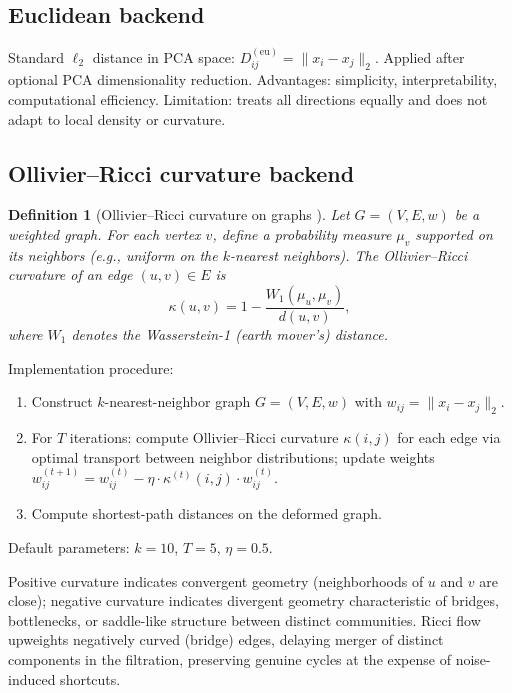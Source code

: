 \documentclass[11pt]{article}
\newtheorem{definition}[theorem]{Definition}
\begin{document}
\subsection{Euclidean backend}

Standard $\ell_2$ distance in PCA space: $D^{(\text{eu})}_{ij} = \|x_i - x_j\|_2$.
Applied after optional PCA dimensionality reduction.
Advantages: simplicity, interpretability, computational efficiency.
Limitation: treats all directions equally and does not adapt to local density or curvature.

\subsection{Ollivier--Ricci curvature backend}

\begin{definition}[Ollivier--Ricci curvature on graphs \cite{ollivier2007,ollivier2009}]\label{def:supp_ricci}
Let $G = (V, E, w)$ be a weighted graph.
For each vertex $v$, define a probability measure $\mu_v$ supported on its neighbors (e.g., uniform on the $k$-nearest neighbors).
The \emph{Ollivier--Ricci curvature} of an edge $(u,v) \in E$ is
\[
\kappa(u,v) = 1 - \frac{W_1(\mu_u, \mu_v)}{d(u,v)},
\]
where $W_1$ denotes the Wasserstein-1 (earth mover's) distance.
\end{definition}

Implementation procedure:
\begin{enumerate}[leftmargin=1.5em]
\item Construct $k$-nearest-neighbor graph $G = (V, E, w)$ with $w_{ij} = \|x_i - x_j\|_2$.
\item For $T$ iterations: compute Ollivier--Ricci curvature $\kappa(i,j)$ for each edge via optimal transport between neighbor distributions; update weights $w_{ij}^{(t+1)} = w_{ij}^{(t)} - \eta \cdot \kappa^{(t)}(i,j) \cdot w_{ij}^{(t)}$.
\item Compute shortest-path distances on the deformed graph.
\end{enumerate}
Default parameters: $k=10$, $T=5$, $\eta=0.5$.

Positive curvature indicates convergent geometry (neighborhoods of $u$ and $v$ are close); negative curvature indicates divergent geometry characteristic of bridges, bottlenecks, or saddle-like structure between distinct communities.
Ricci flow upweights negatively curved (bridge) edges, delaying merger of distinct components in the filtration, preserving genuine cycles at the expense of noise-induced shortcuts.
\end{document}
